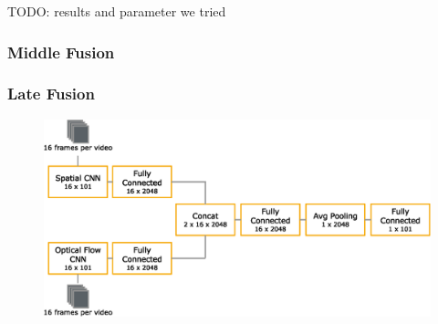 TODO: results and parameter we tried

\subsubsection{Middle Fusion}


\subsubsection{Late Fusion}


\begin{figure}[!htb]
	\centering
	\includegraphics[scale=.7]{images/late_fusion.eps}
	\caption{}
	\label{fig:late_fusion}
\end{figure}



